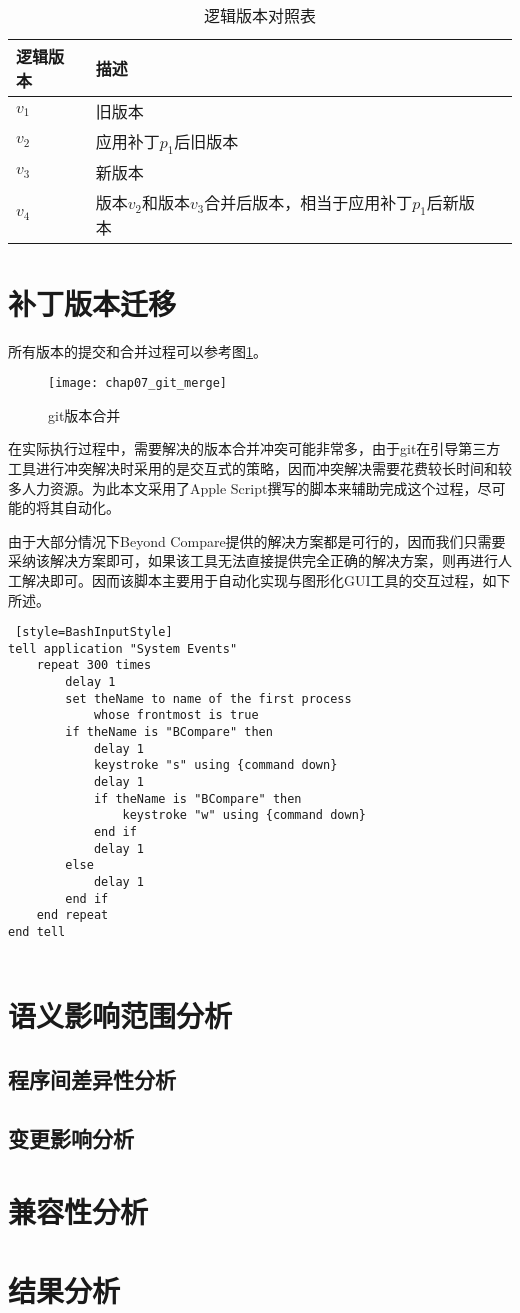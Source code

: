 \begin{table}
	\caption{逻辑版本对照表}
	\label{exp_version}
	\centering
	\begin{tabular}{llc}
		\toprule[1.5pt]
		{\heiti 逻辑版本} & {\heiti 描述} \\\midrule[1pt]
		$v_1$ & 旧版本 \\
		$v_2$ & 应用补丁$p_1$后旧版本\\
		$v_3$ & 新版本\\
		$v_4$ & 版本$v_2$和版本$v_3$合并后版本，相当于应用补丁$p_1$后新版本\\
		\bottomrule[1.5pt]
	\end{tabular}
\end{table}


\section{补丁版本迁移}

所有版本的提交和合并过程可以参考图\ref {exp_git_merge}。

\begin{figure}[H]
	\centering
	\texttt{[image: chap07\_git\_merge]}
	\caption {git版本合并}
	\label {exp_git_merge}	
\end{figure}


在实际执行过程中，需要解决的版本合并冲突可能非常多，由于git在引导第三方工具进行冲突解决时采用的是交互式的策略，因而冲突解决需要花费较长时间和较多人力资源。为此本文采用了Apple Script撰写的脚本来辅助完成这个过程，尽可能的将其自动化。

由于大部分情况下Beyond Compare提供的解决方案都是可行的，因而我们只需要采纳该解决方案即可，如果该工具无法直接提供完全正确的解决方案，则再进行人工解决即可。因而该脚本主要用于自动化实现与图形化GUI工具的交互过程，如下所述。

\begin{lstlisting} [style=BashInputStyle]
tell application "System Events"
	repeat 300 times
		delay 1
		set theName to name of the first process
			whose frontmost is true	
		if theName is "BCompare" then		
			delay 1	
			keystroke "s" using {command down}	
			delay 1	
			if theName is "BCompare" then
				keystroke "w" using {command down}
			end if		
			delay 1		
		else
			delay 1
		end if
	end repeat
end tell


\end{lstlisting}

\section{语义影响范围分析}
\subsection{程序间差异性分析}
\subsection{变更影响分析}
\section{兼容性分析}
\section{结果分析}